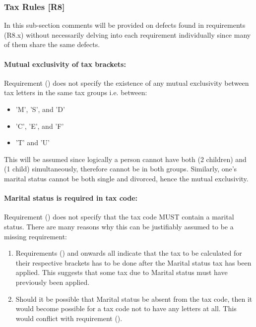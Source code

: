\subsubsection{Tax Rules [R8]}

In this sub-section comments will be provided on defects found in requirements (R8.x) without necessarily delving into each requirement individually since many of them share the same defects.

\paragraph{Mutual exclusivity of tax brackets:}
Requirement (\REightFour) does not specify the existence of any mutual exclusivity between tax letters in the same tax groups i.e. between: 
\begin{itemize}[noitemsep]
\item 'M', 'S', and 'D' 
\item 'C', 'E', and 'F'
\item 'T' and 'U'
\end{itemize}
This will be assumed since logically a person cannot have both (2 children) and (1 child) simultaneously, therefore cannot be in both groups. Similarly, one's marital status cannot be both single and divorced, hence the mutual exclusivity.  

\paragraph{Marital status is required in tax code:}
Requirement (\REightFour) does not specify that the tax code MUST contain a marital status. There are many reasons why this can be justifiably assumed to be a missing requirement: 
\begin{enumerate}
	\item Requirements (\REightEight) and onwards all indicate that the tax to be calculated for their respective brackets has to be done after the Marital status tax has been applied. This suggests that some tax due to Marital status must have previously been applied. 
	\item Should it be possible that Marital status be absent from the tax code, then it would become possible for a tax code not to have any letters at all. This would conflict with requirement (\REightTwo). %
\end{enumerate}

